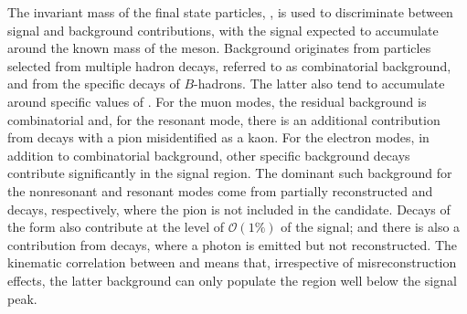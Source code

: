 The invariant mass of the final state particles, \mKll, is used to discriminate between signal and background contributions, with the signal expected to accumulate around the known mass of the \Bp meson.
Background originates from particles selected from multiple hadron decays, referred to as combinatorial background, and from the specific decays of $B$-hadrons. 
The latter also tend to accumulate around specific values of \mKll.
For the muon modes, the residual background is combinatorial and, for the resonant mode, there is an additional contribution from \BuJpsipi decays with a pion misidentified as a kaon. 
For the electron modes, in addition to combinatorial background, other specific background decays contribute significantly in the signal region. The dominant such background for the nonresonant and resonant modes come from partially reconstructed \BuBdKpiplusee and \BuBdKpijpsi decays, respectively, where the pion is not included in the \Bp candidate. Decays of the form \BuDzenu also contribute at the level of $\mathcal{O}(1\%)$ of the \BuKee signal; and there is also a contribution from \BuJpsiKee decays, where a photon is emitted but not reconstructed. 
The kinematic correlation between \mKee and {\qsq} means that, irrespective of misreconstruction effects, the latter background can only populate the \mKee region well below the signal peak. 

